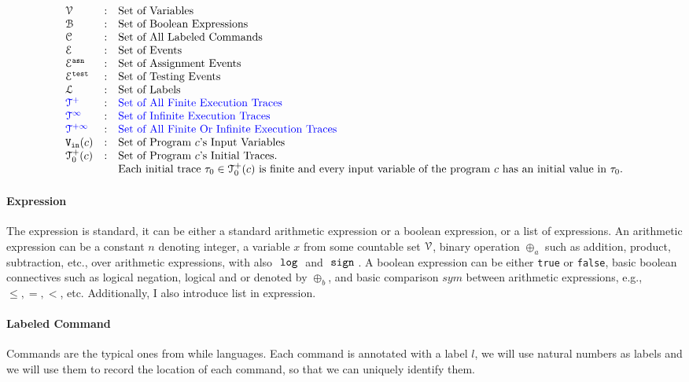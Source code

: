 \[
\begin{array}{lll}
\vardom & : & \mbox{Set of Variables}  
\\ 
%
\booldom & : & \mbox{Set of Boolean Expressions}  
\\ 
%
\cdom & : & \mbox{Set of All Labeled Commands} 
\\ 
%
\eventset  & : & \mbox{Set of Events}  
\\
%
\eventset^{\asn}  & : & \mbox{Set of Assignment Events}  
\\
%
\eventset^{\test}  & : & \mbox{Set of Testing Events}  
\\
%
\ldom  & : & \mbox{Set of Labels}  
\\
%
\highlight{\ftdom} & : & \mbox{\highlight{Set of All Finite Execution Traces}}
\\
\highlight{\inftdom} & : & \mbox{\highlight{Set of Infinite  Execution Traces}}
\\
\highlight{\tdom} & : & \mbox{\highlight{Set of All Finite Or Infinite  Execution Traces}}
\\ 
%
\inpvar(c) & : & \mbox{Set of Program $c$'s Input Variables}  
\\
%
\ftdom_0(c) & : & \mbox{Set of Program $c$'s Initial Traces.}
\\ & & \mbox{Each initial trace $\trace_0 \in \ftdom_0(c)$ is finite and every input variable of the program $c$ has an initial value in $\trace_0$.}
\end{array}
\]
%
\paragraph{Expression}
The expression is standard, it can be
either a standard arithmetic expression or a boolean expression, or a list of expressions.
An arithmetic expression can be a constant $n$ denoting integer, a variable $x$ from some countable set $\mathcal{V}$, binary operation $\oplus_a$ such as addition, product, subtraction, etc., over arithmetic expressions, with also $~\mathtt{log}~$ and $~\mathtt{sign}~$. 
%
A boolean expression can be either {\tt true} or {\tt false}, basic boolean connectives such as logical negation, logical and or denoted by $\oplus_b$, and basic comparison $sym$ between arithmetic expressions, e.g., $\leq, =, <$, etc.
Additionally, I also introduce list in expression.

\paragraph{Labeled Command}
Commands are the typical ones from while languages. Each command is annotated with a label $l$, we will use natural numbers as labels and we will use them to record
the location of each command, so that we can uniquely identify them.

